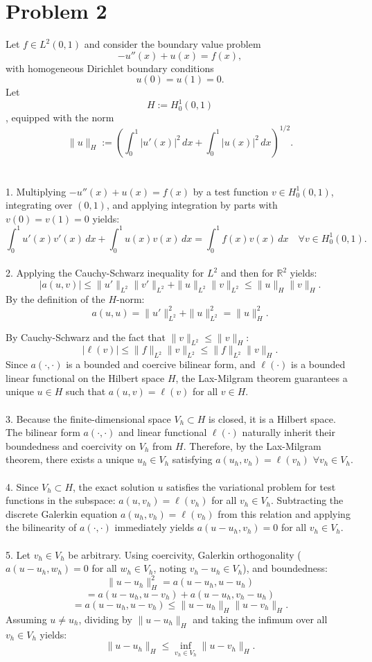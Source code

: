 \documentclass{article}
\begin{document}
\section{Problem 2}
Let $f\in L^2(0,1)$ and consider the boundary value problem
$$-u''(x) + u(x) = f(x),$$
with homogeneous Dirichlet boundary conditions
$$u(0) = u(1) = 0.$$
Let $$H := H^1_0(0,1)$$, equipped with the norm
$$\|u\|_H := \left( \int_0^1 |u'(x)|^2 \, dx + \int_0^1 |u(x)|^2 \, dx \right)^{1/2}.$$
\\
\\
1.  Multiplying $-u''(x) + u(x) = f(x)$ by a test function $v \in H^1_0(0,1)$, integrating over $(0,1)$, and applying integration by parts with $v(0)=v(1)=0$ yields:
$$
\int_0^1 u'(x)v'(x) \, dx + \int_0^1 u(x)v(x) \, dx = \int_0^1 f(x)v(x) \, dx \quad \forall v \in H^1_0(0,1).
$$
\\
2.  Applying the Cauchy-Schwarz inequality for $L^2$ and then for $\mathbb{R}^2$ yields:
\[
|a(u,v)| \leq \|u'\|_{L^2}\|v'\|_{L^2} + \|u\|_{L^2}\|v\|_{L^2} \leq \|u\|_H\|v\|_H.
\]
 By the definition of the $H$-norm:
\[
a(u,u) = \|u'\|_{L^2}^2 + \|u\|_{L^2}^2 = \|u\|_H^2.
\]

 By Cauchy-Schwarz and the fact that $\|v\|_{L^2} \leq \|v\|_H$:
\[
|\ell(v)| \leq \|f\|_{L^2}\|v\|_{L^2} \leq \|f\|_{L^2}\|v\|_H.
\]
 Since $a(\cdot,\cdot)$ is a bounded and coercive bilinear form, and $\ell(\cdot)$ is a bounded linear functional on the Hilbert space $H$, the Lax-Milgram theorem guarantees a unique $u \in H$ such that $a(u,v) = \ell(v)$ for all $v \in H$.
\\
\\
3. Because the finite-dimensional space $V_h \subset H$ is closed, it is a Hilbert space. The bilinear form $a(\cdot,\cdot)$ and linear functional $\ell(\cdot)$ naturally inherit their boundedness and coercivity on $V_h$ from $H$. Therefore, by the Lax-Milgram theorem, there exists a unique $u_h \in V_h$ satisfying $a(u_h, v_h) = \ell(v_h)$ \quad $\forall v_h \in V_h$.
\\
\\
4. Since $V_h \subset H$, the exact solution $u$ satisfies the variational problem for test functions in the subspace: $a(u, v_h) = \ell(v_h)$ for all $v_h \in V_h$. Subtracting the discrete Galerkin equation $a(u_h, v_h) = \ell(v_h)$ from this relation and applying the bilinearity of $a(\cdot,\cdot)$ immediately yields $a(u - u_h, v_h) = 0$ for all $v_h \in V_h$.
\\
\\
5. 
Let $v_h \in V_h$ be arbitrary. Using coercivity, Galerkin orthogonality ($a(u-u_h, w_h)=0$ for all $w_h \in V_h$, noting $v_h-u_h \in V_h$), and boundedness:
\[
\|u - u_h\|_H^2 = a(u - u_h, u - u_h)
\]
\[
= a(u - u_h, u - v_h) + a(u - u_h, v_h - u_h)
\]
\[
= a(u - u_h, u - v_h) \leq \|u - u_h\|_H \|u - v_h\|_H.
\]
Assuming $u \neq u_h$, dividing by $\|u - u_h\|_H$ and taking the infimum over all $v_h \in V_h$ yields:
\[
\|u - u_h\|_H \leq \inf_{v_h \in V_h} \|u - v_h\|_H.
\]
\end{document}
